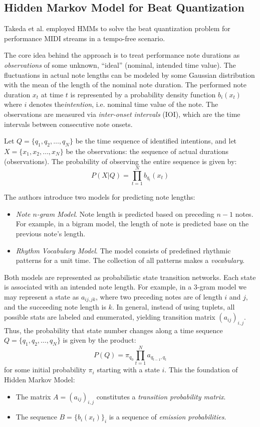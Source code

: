 \subsection{Hidden Markov Model for Beat Quantization}

Takeda et al. \cite{Takeda2002} employed HMMs to solve the beat quantization problem for performance MIDI streams in a tempo-free scenario.

The core idea behind the approach is to treat performance note durations as \emph{observations} of some unknown, ``ideal'' (nominal, intended time value). The fluctuations in actual note lengths can be modeled by some Gaussian distribution with the mean of the length of the nominal note duration. The performed note duration $x_t$ at time $t$ is represented by a probability density function $b_i(x_t)$ where $i$ denotes the\emph{intention}, i.e. nominal time value of the note. The observations are measured via \emph{inter-onset intervals} (IOI), which are the time intervals between consecutive note onsets.

Let $Q = \{q_1,q_2,\ldots, q_N\}$ be the time sequence of identified intentions, and let $X=\{x_1,x_2,\ldots,x_N\}$ be the observations: the sequence of actual durations (observations). The probability of observing the entire sequence is given by: \[P(X|Q)=\prod_{t=1}^N b_{q_t}(x_t)\]

The authors introduce two models for predicting note lengths: \begin{itemize}
	\item \emph{Note $n$-gram Model}. Note length is predicted based on preceding $n - 1$ notes. For example, in a bigram model, the length of note is predicted base on the previous note's length.
	\item \emph{Rhythm Vocabulary Model}. The model consists of predefined rhythmic patterns for a unit time. The collection of all patterns makes a \emph{vocabulary}.\end{itemize}
	
Both models are represented as probabilistic state transition networks. Each state is associated with an intended note length. For example, in a $3$-gram model we may represent a state as $a_{ij,jk}$, where two preceding notes are of length $i$ and $j$, and the succeeding note length is $k$. In general, instead of using tuplets, all possible stats are labeled and enumerated, yielding transition matrix $(a_{ij})_{i,j}$. Thus, the probability that state number changes along a time sequence $Q=\{q_1,q_2,\ldots,q_N\}$ is given by the product: \[P(Q)=\pi_{q_0}\prod_{t=1}^N a_{q_{t-1},q_t}\] for some initial probability $\pi_i$ starting with a state $i$. This the foundation of Hidden Markov Model: \begin{itemize}
	\item The matrix $A=(a_{ij})_{i,j}$ constitutes a \emph{transition probability matrix}.
	\item The sequence $B=\{b_i(x_t)\}_{i}$ is a sequence of \emph{emission probabilities}.
\end{itemize}

